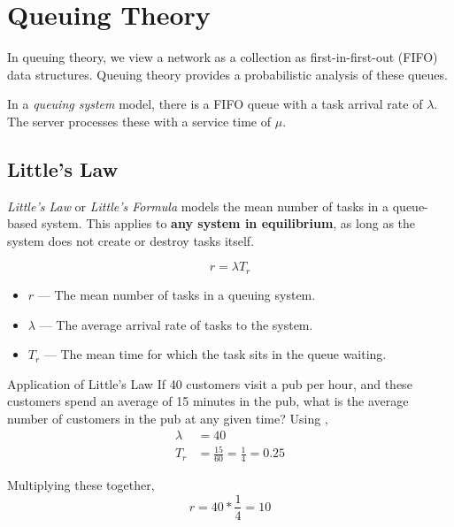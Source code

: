 \section{Queuing Theory}\label{sec:Queuing_Theory}
In queuing theory, we view a network as a collection as first-in-first-out (FIFO) data structures.
Queuing theory provides a probabilistic analysis of these queues.

\begin{definition}\label{def:Queuing_System}
  In a \emph{queuing system} model, there is a FIFO queue with a task arrival rate of $\lambda$.
  The server processes these with a service time of $\mu$.
\end{definition}

\subsection{Little's Law}\label{subsec:Littles_Law}
\begin{definition}\label{def:Littles_Law}\label{def:Littles_Formula}
  \emph{Little's Law} or \emph{Little's Formula} models the mean number of tasks in a queue-based system.
  This applies to \textbf{any system in equilibrium}, as long as the system does not create or destroy tasks itself.

  \begin{equation}\label{eq:Littles_Law}%
    r = \lambda T_{r}
  \end{equation}
  \begin{itemize}[noitemsep]
  \item $r$ --- The mean number of tasks in a queuing system.
  \item $\lambda$ --- The average arrival rate of tasks to the system.
  \item $T_{r}$ --- The mean time for which the task sits in the queue waiting.
  \end{itemize}
\end{definition}

\begin{example}[Lecture 3]{Application of Little's Law}
  If 40 customers visit a pub per hour, and these customers spend an average of 15 minutes in the pub, what is the average number of customers in the pub at any given time?
  \tcblower{}
  Using ,
  \begin{align*}
    \lambda &= 40 \\
    T_{r} &= \frac{15}{60} = \frac{1}{4} = 0.25
  \end{align*}

  Multiplying these together,
  \begin{equation*}
    r = 40 * \frac{1}{4} = 10
  \end{equation*}
\end{example}

